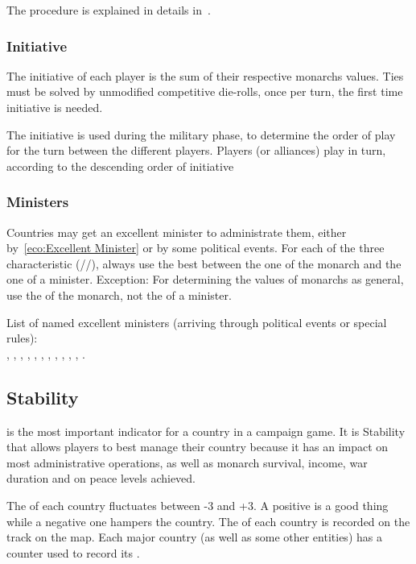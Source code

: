 \aparag The procedure is explained in details in~.


\subsubsection{Initiative}
\aparag The initiative of each player is the sum of their respective monarchs
values.
\bparag Ties must be solved by unmodified competitive die-rolls, once per
turn, the first time initiative is needed.

\aparag The initiative is used during the military phase, to determine the
order of play for the turn between the different players.
\bparag Players (or alliances) play in turn, according to the descending order
of initiative


\subsubsection{Ministers}
\aparag Countries may get an excellent minister to administrate them, either
by~\ref{eco:Excellent Minister} or by some political events.
\bparag For each of the three characteristic (\ADM/\DIP/\MIL), always use the
best between the one of the monarch and the one of a minister.
\bparag Exception: For determining the values of monarchs as general, use the
\MIL of the monarch, not the \MIL of a minister.

\aparag List of named excellent ministers (arriving through political events
or special rules):\\
\ministreColbert, \ministreHeinsius, \ministreKaunitz, \ministreKoprulu,
\ministreMazarin, \ministreOlivares, \ministreOxenstierna, \ministrePatkul,
\ministrePitt, \ministrePotemkine, \ministreRichelieu, .

\subsection{Stability}


\STAB is the most important indicator for a country in a campaign game. It is
Stability that allows players to best manage their country because it has an
impact on most administrative operations, as well as monarch survival, income,
war duration and on peace levels achieved.

\aparag The \STAB of each country fluctuates between -3 and +3. A positive
\STAB is a good thing while a negative one hampers the country.
\bparag The \STAB of each country is recorded on the \STAB track on the \ROTW
map.
\bparag Each major country (as well as some other entities) has a \STAB
counter used to record its \STAB.

